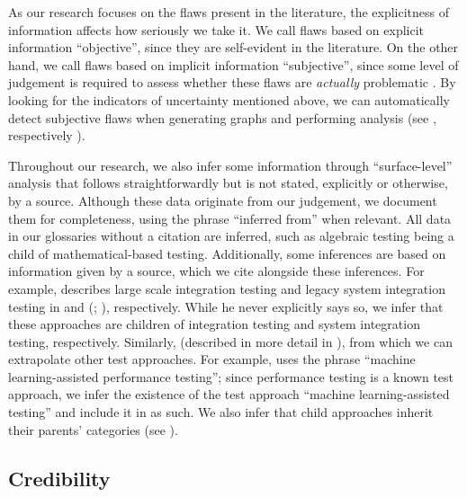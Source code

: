 As our research focuses on the flaws present in the literature, the
explicitness of information affects how seriously we take it. We call flaws
based on explicit information ``objective'', since they are self-evident in
the literature. On the other hand, we call flaws based on implicit information
``subjective'', since some level of judgement is required to assess whether
these flaws are \emph{actually} problematic%
. By looking for the indicators of uncertainty mentioned above, we can
automatically detect subjective flaws when generating graphs and performing
analysis (see \ifnotpaper {}, respectively\else
    \fi).

\ifnotpaper
    \label{infers}
    Throughout our research, we also infer some information through
    ``surface-level'' analysis that follows straightforwardly but is not stated,
    explicitly or otherwise, by a source. Although these data originate from
    our judgement, we document them for completeness, using the phrase
    ``inferred from'' when relevant. All data in our glossaries without a
    citation are inferred, such as algebraic testing
    \citep[Fig.~12.2]{PetersAndPedrycz2000} being a child of mathematical-based
    testing. Additionally, some inferences are based on information given by a
    source, which we cite alongside these inferences. For example,
    \citeauthor{Gerrard2000a} describes large scale integration testing and
    legacy system integration testing in \citeyearpar[p.~30]{Gerrard2000b} and
    (\citeyear[Tab.~2]{Gerrard2000a}; \citeyear[Tab.~1]{Gerrard2000b}),
    respectively. While he never explicitly says so, we infer that these
    approaches are children of integration testing and system integration
    testing, respectively. Similarly, \orthTestIntro* (described in
    more detail in ), from which we can extrapolate other test
    approaches. For example, \citet{Moghadam2019} uses the phrase ``machine
    learning-assisted performance testing''; since performance testing is a
    known test approach, we infer the existence of the test approach ``machine
    learning-assisted testing'' and include it in \ourApproachGlossary{} as
    such. We also infer that child approaches inherit their parents' categories
    (see ).

    \newpage
\fi

\subsection{Credibility}\label{cred}

